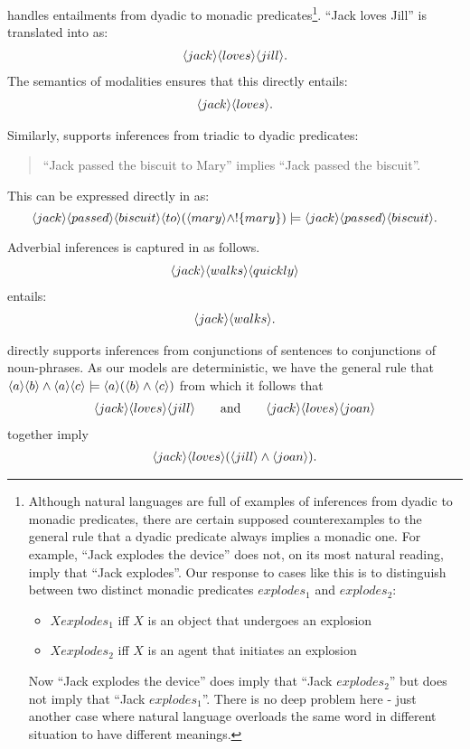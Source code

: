 \NI \Cathoristic{} handles entailments from dyadic to monadic predicates\footnote{Although
  natural languages are full of examples of inferences from dyadic to
  monadic predicates, there are certain supposed counterexamples to
  the general rule that a dyadic predicate always implies a monadic
  one. For example, ``Jack explodes the device'' does not, on its most
  natural reading, imply that ``Jack explodes''. Our response to cases
  like this is to distinguish between two distinct monadic predicates
  $explodes_1$ and $explodes_2$:
 \begin{itemize}
 \item
 $X explodes_1$ iff $X$ is an object that undergoes an explosion
 \item
 $X explodes_2$ iff $X$ is an agent that initiates an explosion
 \end{itemize}
 Now ``Jack explodes the device'' does imply that ``Jack $explodes_2$'' but does not imply that ``Jack $explodes_1$''. 
There is no deep problem here - just another case where natural language overloads the same word in different situation to have different meanings.}.
``Jack loves Jill'' is translated into \cathoristic{} as:
\begin{eqnarray*}
   \langle jack \rangle \langle loves \rangle \langle jill \rangle .
\end{eqnarray*}
The semantics of modalities ensures that this directly entails:
\begin{eqnarray*}
   \langle jack \rangle \langle loves \rangle .
\end{eqnarray*}

\NI Similarly, \cathoristic{} supports inferences from triadic to dyadic
predicates:
\begin{quote}
  ``Jack passed the biscuit to Mary'' implies ``Jack passed the biscuit''.
\end{quote}

\NI This can be expressed directly in \cathoristic{} as:
\[
   \langle jack \rangle \langle passed \rangle \langle biscuit \rangle \langle to \rangle (\langle mary \rangle \land !\{mary\}) \models \langle jack \rangle \langle passed \rangle \langle biscuit \rangle .
\]

\NI Adverbial inferences is captured in \cathoristic{} as follows.
\begin{eqnarray*}
  \langle jack \rangle \langle walks \rangle \langle quickly \rangle \end{eqnarray*}
entails:
\begin{eqnarray*}
  \langle jack \rangle \langle walks \rangle .
\end{eqnarray*}

\NI \Cathoristic{} directly supports inferences from conjunctions of
sentences to conjunctions of noun-phrases.  As our models are
deterministic, we have the general rule that $ \langle a \rangle \langle b \rangle \land
\langle a \rangle \langle c \rangle \models \langle a \rangle (\langle b \rangle \land \langle c \rangle )$ from which
it follows that
\begin{eqnarray*}
   \langle jack \rangle \langle loves \rangle \langle jill \rangle \qquad\text{and}\qquad
   \langle jack \rangle \langle loves \rangle \langle joan \rangle \end{eqnarray*}
together imply
\begin{eqnarray*}
\langle jack \rangle \langle loves \rangle (\langle jill \rangle \land \langle joan \rangle ).
\end{eqnarray*}

